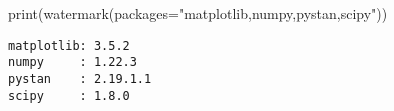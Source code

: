 \documentclass[
  letterpaper,
  DIV=11,
  numbers=noendperiod]{scrartcl}
\newenvironment{Shaded}{\begin{snugshade}}{\end{snugshade}}
\newcommand{\BuiltInTok}[1]{\textcolor[rgb]{0.00,0.23,0.31}{#1}}
\newcommand{\NormalTok}[1]{\textcolor[rgb]{0.00,0.23,0.31}{#1}}
\newcommand{\OperatorTok}[1]{\textcolor[rgb]{0.37,0.37,0.37}{#1}}
\newcommand{\StringTok}[1]{\textcolor[rgb]{0.13,0.47,0.30}{#1}}
\begin{document}
\begin{Shaded}
\begin{Highlighting}[]
\BuiltInTok{print}\NormalTok{(watermark(packages}\OperatorTok{=}\StringTok{"matplotlib,numpy,pystan,scipy"}\NormalTok{))}
\end{Highlighting}
\end{Shaded}

\begin{verbatim}
matplotlib: 3.5.2
numpy     : 1.22.3
pystan    : 2.19.1.1
scipy     : 1.8.0
\end{verbatim}
\end{document}
